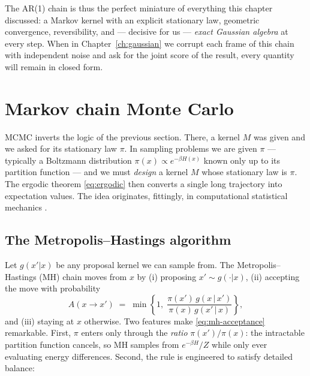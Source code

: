 The AR(1) chain is thus the perfect miniature of everything this chapter
discussed: a Markov kernel with an explicit stationary law, geometric
convergence, reversibility, and --- decisive for us --- \emph{exact
Gaussian algebra} at every step. When in Chapter~\ref{ch:gaussian} we corrupt
each frame of this chain with independent noise and ask for the joint score
of the result, every quantity will remain in closed form.

\section{Markov chain Monte Carlo}\label{sec:mcmc}

MCMC inverts the logic of the previous section. There, a kernel $M$ was
given and we asked for its stationary law $\pi$. In sampling problems we are
given $\pi$ --- typically a Boltzmann distribution
$\pi(x) \propto e^{-\beta H(x)}$ known only up to its partition function ---
and we must \emph{design} a kernel $M$ whose stationary law is $\pi$. The
ergodic theorem \eqref{eq:ergodic} then converts a single long trajectory
into expectation values. The idea originates, fittingly, in computational
statistical mechanics \citep{metropolis1953equation}.

\subsection{The Metropolis--Hastings algorithm}

Let $g(x' | x)$ be any proposal kernel we can sample from. The
Metropolis--Hastings (MH) chain \citep{metropolis1953equation,
hastings1970monte} moves from $x$ by (i) proposing $x' \sim g(\cdot | x)$,
(ii) accepting the move with probability
\begin{equation}
  A(x \to x') \;=\; \min\!\left\{ 1,\;
    \frac{\pi(x')\, g(x \,|\, x')}{\pi(x)\, g(x' \,|\, x)}
  \right\},
  \label{eq:mh-acceptance}
\end{equation}
and (iii) staying at $x$ otherwise. Two features make
\eqref{eq:mh-acceptance} remarkable. First, $\pi$ enters only through the
\emph{ratio} $\pi(x')/\pi(x)$: the intractable partition function cancels,
so MH samples from $e^{-\beta H}/Z$ while only ever evaluating energy
differences. Second, the rule is engineered to satisfy detailed balance:

